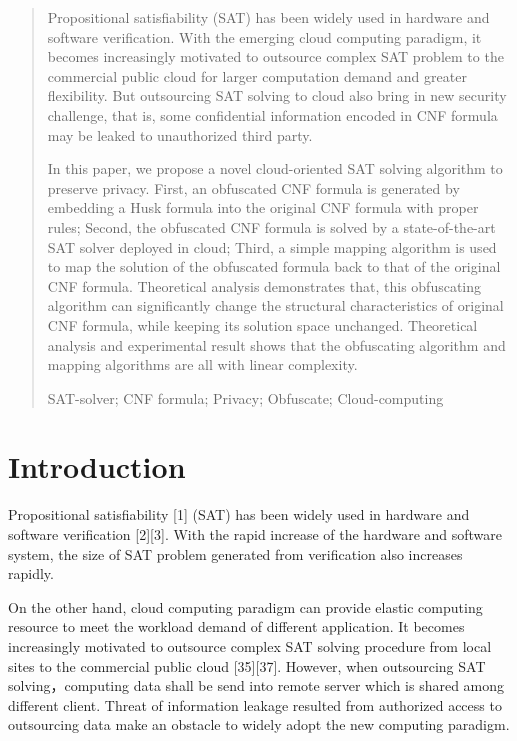 \documentclass[runningheads,a4paper]{llncs}
\newcommand{\keywords}[1]{\par\addvspace\baselineskip
\noindent\keywordname\enspace\ignorespaces#1}
\begin{document}
\begin{abstract}

\setlength{\parindent}{2em}

Propositional satisfiability (SAT) has been widely used in hardware and software verification. With the emerging cloud computing paradigm, it becomes increasingly motivated to outsource complex SAT problem to the commercial public cloud for larger computation demand and greater flexibility. But outsourcing SAT solving to cloud also bring in new security challenge, that is, some confidential information encoded in CNF formula may be leaked to unauthorized third party.

In this paper, we propose a novel cloud-oriented SAT solving algorithm to preserve privacy.
First, an obfuscated CNF formula is generated by embedding a Husk formula into the original CNF formula with proper rules;
Second, the obfuscated CNF formula is solved by a state-of-the-art SAT solver deployed in cloud;
Third, a simple mapping algorithm is used to map the solution of the obfuscated formula back to that of the original CNF formula. 
Theoretical analysis demonstrates that, this obfuscating algorithm can significantly change the structural characteristics of original CNF formula, 
while keeping its solution space unchanged.
Theoretical analysis and experimental result shows that the obfuscating algorithm and mapping algorithms are all with linear complexity.

\keywords{SAT-solver; CNF formula; Privacy; Obfuscate; Cloud-computing}
\end{abstract}

\section{Introduction}

\setlength{\parindent}{2em}Propositional satisfiability [1] (SAT) has been widely used in hardware and software verification [2][3]. With the rapid increase of the hardware and software system, the size of SAT problem generated from verification also increases rapidly. 

On the other hand, cloud computing paradigm can provide elastic computing resource to meet the workload demand of different application. It becomes increasingly motivated to outsource complex SAT solving procedure from local sites to the commercial public cloud [35][37]. However, when outsourcing SAT solving，computing data shall be send into remote server which is shared among different client. Threat of information leakage resulted from authorized access to outsourcing data make an obstacle to widely adopt the new computing paradigm. 
\end{document}
